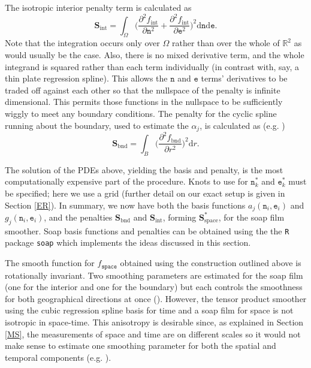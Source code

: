 The isotropic interior penalty term is calculated as
$$
\textbf{S}_\text{int} = \int_\Omega \Big(\frac{\partial^2 f_\text{int}}{\partial \texttt{n}^2}+\frac{\partial^2 f_\text{int}}{\partial \texttt{e}^2} 
\Big)^2\text{d}\texttt{n}\text{d}\texttt{e}.
$$
Note that the integration occurs only over $\Omega$ rather than over the whole of $\mathbb{R}^2$ as would usually be the case. Also, there is no mixed derivative term, and the whole integrand is squared rather than each term individually (in contrast with, say, a thin plate regression spline). This allows the $\texttt{n}$ and $\texttt{e}$ terms' derivatives to be traded off against each other so that the nullspace of the penalty is infinite dimensional. This permits those functions in the nullspace to be sufficiently wiggly to meet any boundary conditions. The penalty for the cyclic spline running about the boundary, used to estimate the $\alpha_j$, is calculated as (e.g. \cite{simonbook})
$$
\textbf{S}_\text{bnd} = \int_B \Big(\frac{\partial^2 f_\text{bnd}}{\partial r^2}\Big)^2 \text{d}r.
$$

The solution of the PDEs above, yielding the basis and penalty, is the most computationally expensive part of the procedure. Knots to use for $\texttt{n}_k^*$ and $\texttt{e}_k^*$ must be specified; here we use a grid (further detail on our exact setup is given in Section \ref{ER}). In summary, we now have both the basis functions $a_j(\texttt{n}_i,\texttt{e}_i)$ and $g_j(\texttt{n}_i,\texttt{e}_i)$, and the penalties $\textbf{S}_\text{bnd}$ and $\textbf{S}_\text{int}$, forming $\textbf{S}^*_\text{space}$, for the soap film smoother. Soap basis functions and penalties can be obtained using the the \texttt{R} package \texttt{soap} which implements the ideas discussed in this section.

The smooth function for $f_\texttt{space}$ obtained using the construction outlined above is rotationally invariant. Two smoothing parameters are estimated for the soap film (one for the interior and one for the boundary) but each controls the smoothness for both geographical directions at once (\cite{soap}). However, the tensor product smoother using the cubic regression spline basis for time and a soap film for space is not isotropic in space-time. This anisotropy is desirable since, as explained in Section \ref{MS}, the measurements of space and time are on different scales so it would not make sense to estimate one smoothing parameter for both the spatial and temporal components (e.g. \cite[p. 162]{simonbook}).
 

